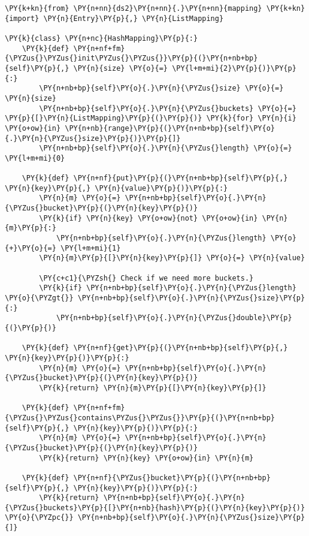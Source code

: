\begin{Verbatim}[commandchars=\\\{\}]
\PY{k+kn}{from} \PY{n+nn}{ds2}\PY{n+nn}{.}\PY{n+nn}{mapping} \PY{k+kn}{import} \PY{n}{Entry}\PY{p}{,} \PY{n}{ListMapping}

\PY{k}{class} \PY{n+nc}{HashMapping}\PY{p}{:}
    \PY{k}{def} \PY{n+nf+fm}{\PYZus{}\PYZus{}init\PYZus{}\PYZus{}}\PY{p}{(}\PY{n+nb+bp}{self}\PY{p}{,} \PY{n}{size} \PY{o}{=} \PY{l+m+mi}{2}\PY{p}{)}\PY{p}{:}
        \PY{n+nb+bp}{self}\PY{o}{.}\PY{n}{\PYZus{}size} \PY{o}{=} \PY{n}{size}
        \PY{n+nb+bp}{self}\PY{o}{.}\PY{n}{\PYZus{}buckets} \PY{o}{=} \PY{p}{[}\PY{n}{ListMapping}\PY{p}{(}\PY{p}{)} \PY{k}{for} \PY{n}{i} \PY{o+ow}{in} \PY{n+nb}{range}\PY{p}{(}\PY{n+nb+bp}{self}\PY{o}{.}\PY{n}{\PYZus{}size}\PY{p}{)}\PY{p}{]}
        \PY{n+nb+bp}{self}\PY{o}{.}\PY{n}{\PYZus{}length} \PY{o}{=} \PY{l+m+mi}{0}

    \PY{k}{def} \PY{n+nf}{put}\PY{p}{(}\PY{n+nb+bp}{self}\PY{p}{,} \PY{n}{key}\PY{p}{,} \PY{n}{value}\PY{p}{)}\PY{p}{:}
        \PY{n}{m} \PY{o}{=} \PY{n+nb+bp}{self}\PY{o}{.}\PY{n}{\PYZus{}bucket}\PY{p}{(}\PY{n}{key}\PY{p}{)}
        \PY{k}{if} \PY{n}{key} \PY{o+ow}{not} \PY{o+ow}{in} \PY{n}{m}\PY{p}{:}
            \PY{n+nb+bp}{self}\PY{o}{.}\PY{n}{\PYZus{}length} \PY{o}{+}\PY{o}{=} \PY{l+m+mi}{1}
        \PY{n}{m}\PY{p}{[}\PY{n}{key}\PY{p}{]} \PY{o}{=} \PY{n}{value}

        \PY{c+c1}{\PYZsh{} Check if we need more buckets.}
        \PY{k}{if} \PY{n+nb+bp}{self}\PY{o}{.}\PY{n}{\PYZus{}length} \PY{o}{\PYZgt{}} \PY{n+nb+bp}{self}\PY{o}{.}\PY{n}{\PYZus{}size}\PY{p}{:}
            \PY{n+nb+bp}{self}\PY{o}{.}\PY{n}{\PYZus{}double}\PY{p}{(}\PY{p}{)}

    \PY{k}{def} \PY{n+nf}{get}\PY{p}{(}\PY{n+nb+bp}{self}\PY{p}{,} \PY{n}{key}\PY{p}{)}\PY{p}{:}
        \PY{n}{m} \PY{o}{=} \PY{n+nb+bp}{self}\PY{o}{.}\PY{n}{\PYZus{}bucket}\PY{p}{(}\PY{n}{key}\PY{p}{)}
        \PY{k}{return} \PY{n}{m}\PY{p}{[}\PY{n}{key}\PY{p}{]}

    \PY{k}{def} \PY{n+nf+fm}{\PYZus{}\PYZus{}contains\PYZus{}\PYZus{}}\PY{p}{(}\PY{n+nb+bp}{self}\PY{p}{,} \PY{n}{key}\PY{p}{)}\PY{p}{:}
        \PY{n}{m} \PY{o}{=} \PY{n+nb+bp}{self}\PY{o}{.}\PY{n}{\PYZus{}bucket}\PY{p}{(}\PY{n}{key}\PY{p}{)}
        \PY{k}{return} \PY{n}{key} \PY{o+ow}{in} \PY{n}{m}

    \PY{k}{def} \PY{n+nf}{\PYZus{}bucket}\PY{p}{(}\PY{n+nb+bp}{self}\PY{p}{,} \PY{n}{key}\PY{p}{)}\PY{p}{:}
        \PY{k}{return} \PY{n+nb+bp}{self}\PY{o}{.}\PY{n}{\PYZus{}buckets}\PY{p}{[}\PY{n+nb}{hash}\PY{p}{(}\PY{n}{key}\PY{p}{)} \PY{o}{\PYZpc{}} \PY{n+nb+bp}{self}\PY{o}{.}\PY{n}{\PYZus{}size}\PY{p}{]}


\end{Verbatim}
